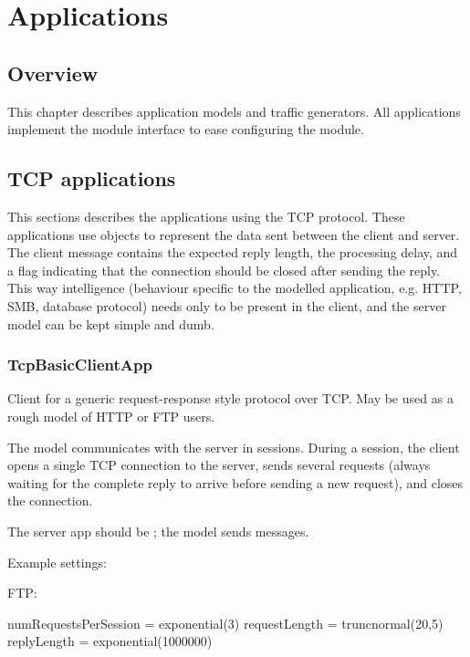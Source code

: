 \chapter{Applications}
\label{cha:apps}


\section{Overview}
\label{sec:apps:overview}

This chapter describes application models and traffic generators.
All applications implement the  module interface
to ease configuring the  module.

\section{TCP applications}
\label{sec:apps:tcp-applications}

This sections describes the applications using the TCP protocol.
These applications use  objects to represent the data
sent between the client and server. The client message contains the expected
reply length, the processing delay, and a flag indicating that the connection
should be closed after sending the reply. This way intelligence (behaviour
specific to the modelled application, e.g. HTTP, SMB, database protocol) needs
only to be present in the client, and the server model can be kept simple and
dumb.


\subsection{TcpBasicClientApp}
\label{sec:apps:tcpbasicclientapp}

Client for a generic request-response style protocol over TCP.
May be used as a rough model of HTTP or FTP users.

The model communicates with the server in sessions. During a session,
the client opens a single TCP connection to the server, sends several
requests (always waiting for the complete reply to arrive before
sending a new request), and closes the connection.

The server app should be ; the model sends
 messages.

Example settings:

FTP:

\begin{inifile}
numRequestsPerSession = exponential(3)
requestLength = truncnormal(20,5)
replyLength = exponential(1000000)
\end{inifile}

